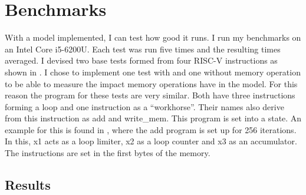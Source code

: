 \chapter{Benchmarks}\label{chap:benchmarks}
With a model implemented, I can test how good it runs. I run my
benchmarks on an Intel Core i5-6200U. Each test was run five times
and the resulting times averaged. I devised two base tests formed
from four RISC-V instructions as shown in
. I chose to implement one test with and
one without memory operation to be able to measure the impact memory
operations have in the model. For this reason the program for these
tests are very similar. Both have three instructions forming a loop
and one instruction as a \enquote{workhorse}. Their names also derive
from this instruction as add and write\_mem. This program is set into
a state. An example for this is found in ,
where the add program is set up for 256 iterations. In this, x1 acts
as a loop limiter, x2 as a loop counter and x3 as an accumulator. The
instructions are set in the first bytes of the memory.




\section{Results}
